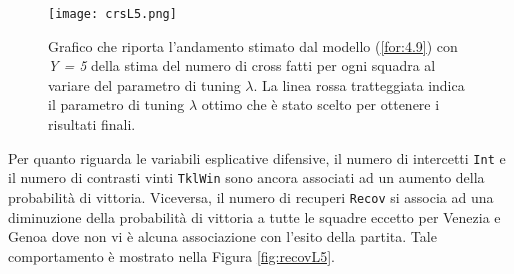 \begin{figure}[htbp]
	\begin{center}
		\texttt{[image: crsL5.png]}
		\caption{Grafico che riporta l'andamento stimato dal modello (\ref{for:4.9}) con \emph{Y = 5} della stima del numero di cross fatti per ogni squadra al variare del parametro di tuning $\lambda$. La linea rossa tratteggiata indica il parametro di tuning $\lambda$ ottimo che è stato scelto per ottenere i risultati finali.} \label{fig:crsL5}
	\end{center}
\end{figure}
Per quanto riguarda le variabili esplicative difensive, il numero di intercetti \texttt{Int} e il numero di contrasti vinti \texttt{TklWin} sono ancora associati ad un aumento della probabilità di vittoria. Viceversa, il numero di recuperi \texttt{Recov} si associa ad una diminuzione della probabilità di vittoria a tutte le squadre eccetto per Venezia e Genoa dove non vi è alcuna associazione con l'esito della partita. Tale comportamento è mostrato nella Figura \ref{fig:recovL5}.


